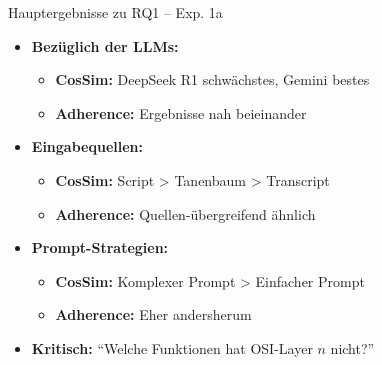 \documentclass[usenames, dvipsnames, aspectratio=32]{beamer}
\begin{document}
\begin{frame}{Hauptergebnisse zu RQ1 -- Exp. 1a}
    \begin{itemize}
        \item \textbf{Bezüglich der LLMs:}
        \begin{itemize}
            \item[$\to$] \textbf{CosSim:} DeepSeek R1 schwächstes, Gemini bestes
            \item[$\to$] \textbf{Adherence:} Ergebnisse nah beieinander
        \end{itemize}
        \vspace{.5em}
        \item \textbf{Eingabequellen:}
        \begin{itemize}
            \item[$\to$] \textbf{CosSim:} Script > Tanenbaum > Transcript
            \item[$\to$] \textbf{Adherence:} Quellen-übergreifend ähnlich
        \end{itemize}
        \vspace{.5em}
        \item \textbf{Prompt-Strategien:}
        \begin{itemize}
            \item[$\to$] \textbf{CosSim:} Komplexer Prompt > Einfacher Prompt
            \item[$\to$] \textbf{Adherence:} Eher andersherum \vspace{.5em}
        \end{itemize}
        \item \textbf{Kritisch:} \enquote{Welche Funktionen hat OSI-Layer $n$ nicht?}
    \end{itemize}
\end{frame}
\end{document}
